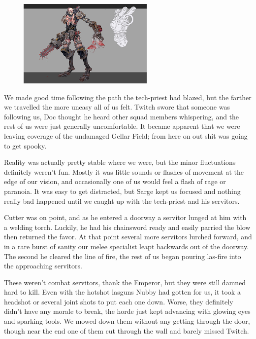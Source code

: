 \begin{figure}
	\begin{center}
		\includegraphics[width=\figwidth]{pics/7/22.png}
	\end{center}
\end{figure}
We made good time following the path the tech-priest had blazed, but the farther we travelled the more uneasy all of us felt. 
Twitch swore that someone was following us, Doc thought he heard other squad members whispering, and the rest of us were just generally uncomfortable. 
It became apparent that we were leaving coverage of the undamaged Gellar Field; 
from here on out shit was going to get spooky. 


Reality was actually pretty stable where we were, but the minor fluctuations definitely weren’t fun. 
Mostly it was little sounds or flashes of movement at the edge of our vision, and occasionally one of us would feel a flash of rage or paranoia. 
It was easy to get distracted, but Sarge kept us focused and nothing really bad happened until we caught up with the tech-priest and his servitors.

Cutter was on point, and as he entered a doorway a servitor lunged at him with a welding torch. 
Luckily, he had his chainsword ready and easily parried the blow then returned the favor. 
At that point several more servitors lurched forward, and in a rare burst of sanity our melee specialist leapt backwards out of the doorway. 
The second he cleared the line of fire, the rest of us began pouring las-fire into the approaching servitors.

These weren’t combat servitors, thank the Emperor, but they were still damned hard to kill. 
Even with the hotshot lasguns Nubby had gotten for us, it took a headshot or several joint shots to put each one down. 
Worse, they definitely didn’t have any morale to break, the horde just kept advancing with glowing eyes and sparking tools. 
We mowed down them without any getting through the door, though near the end one of them cut through the wall and barely missed Twitch.

